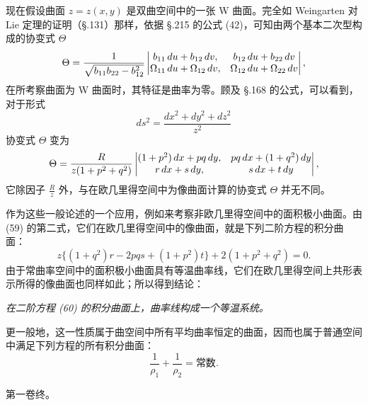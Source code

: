 现在假设曲面 $z=z(x,y)$ 是双曲空间中的一张 W 曲面。完全如 Weingarten 对 Lie 定理的证明（\S.131）那样，依据 \S.215 的公式 (42)，可知由两个基本二次型构成的协变式 $\Theta$
\[
\Theta=\frac1{\sqrt{b_{11}b_{22}-b_{12}^2}}
\left|\begin{matrix}b_{11}\,du+b_{12}\,dv,&b_{12}\,du+b_{22}\,dv\\
\Omega_{11}\,du+\Omega_{12}\,dv,&\Omega_{12}\,du+\Omega_{22}\,dv\end{matrix}\right|,
\]
在所考察曲面为 W 曲面时，其特征是曲率为零。顾及 \S.168 的公式，可以看到，对于形式
\[
ds^2=\frac{dx^2+dy^2+dz^2}{z^2}
\]
协变式 $\Theta$ 变为
\[
\Theta=\frac{R}{z(1+p^2+q^2)}
\left|\begin{matrix}(1+p^2)\,dx+pq\,dy,&pq\,dx+(1+q^2)\,dy\\
r\,dx+s\,dy,&s\,dx+t\,dy\end{matrix}\right|,
\]
它除因子 $\frac Rz$ 外，与在欧几里得空间中为像曲面计算的协变式 $\Theta$ 并无不同。


作为这些一般论述的一个应用，例如来考察非欧几里得空间中的面积极小曲面。由 (59) 的第二式，它们在欧几里得空间中的像曲面，就是下列二阶方程的积分曲面：
\[
\tag{60}
z\{(1+q^2)r-2pqs+(1+p^2)t\}+2(1+p^2+q^2)=0.
\]
由于常曲率空间中的面积极小曲面具有等温曲率线，它们在欧几里得空间上共形表示所得的像曲面也同样如此；所以得到结论：

\emph{在二阶方程 (60) 的积分曲面上，曲率线构成一个等温系统。}

更一般地，这一性质属于曲空间中所有平均曲率恒定的曲面，因而也属于普通空间中满足下列方程的所有积分曲面：
\[
\frac1{\rho_1}+\frac1{\rho_2}=\text{常数}.
\]

\begin{center}
\vspace{1em}
第一卷终。
\end{center}

\clearpage
